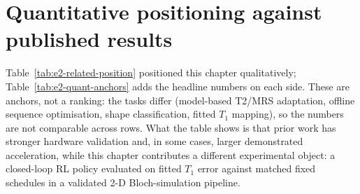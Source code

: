 \section{Quantitative positioning against published results}
\label{sec:e2-quant-position}

Table~\ref{tab:e2-related-position} positioned this chapter qualitatively;
Table~\ref{tab:e2-quant-anchors} adds the headline numbers on each side.
These are anchors, not a ranking: the tasks differ (model-based T2/MRS
adaptation, offline sequence optimisation, shape classification, fitted
$T_1$ mapping), so the numbers are not comparable across rows. What the
table shows is that prior work has stronger hardware validation and, in
some cases, larger demonstrated acceleration, while this chapter
contributes a different experimental object: a closed-loop RL policy
evaluated on fitted $T_1$ error against matched fixed schedules in a
validated 2-D Bloch-simulation pipeline.

